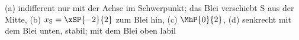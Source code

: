 (a) indifferent nur mit der Achse im Schwerpunkt; das Blei verschiebt S aus der Mitte, (b) $x_\mathrm{S} = \xSP{-2}{2}$ zum Blei hin, (c) $\MhP{0}{2}$, (d) senkrecht mit dem Blei unten, stabil; mit dem Blei oben labil
